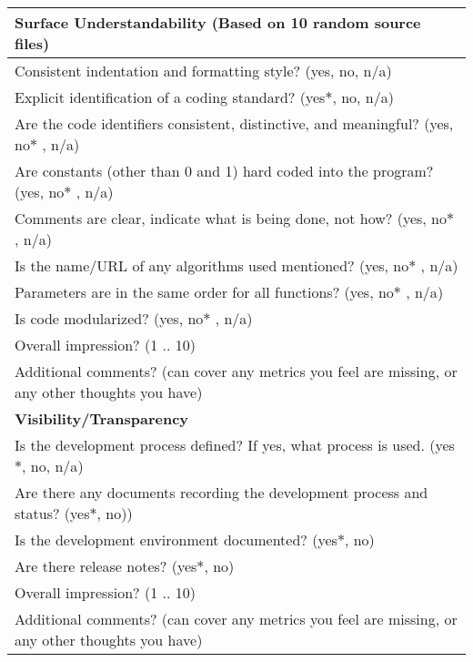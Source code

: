 \begin{table}[H]
\begin{tabular}{p{14cm}}
\hline
\textbf{Surface Understandability (Based on 10 random source files)}\\
\hline
Consistent indentation and formatting style? ({yes, no, n/a})\\
Explicit identification of a coding standard? ({yes$\ast$, no, n/a})\\
Are the code identifiers consistent, distinctive, and meaningful? ({yes, no$\ast$ , n/a})\\
Are constants (other than 0 and 1) hard coded into the program? ({yes, no$\ast$ , n/a})\\
Comments are clear, indicate what is being done, not how? ({yes, no$\ast$ , n/a})\\
Is the name/URL of any algorithms used mentioned? ({yes, no$\ast$ , n/a})\\
Parameters are in the same order for all functions? ({yes, no$\ast$ , n/a})\\
Is code modularized? ({yes, no$\ast$ , n/a})\\
Overall impression? ({1 .. 10})\\
Additional comments? (can cover any metrics you feel are missing, or any other thoughts you have)\\
\hline
\textbf{Visibility/Transparency}\\
\hline
Is the development process defined? If yes, what process is used. ({yes$\ast$, no, n/a})\\
Are there any documents recording the development process and status?  ({yes$\ast$, no}))\\
Is the development environment documented? ({yes$\ast$, no})\\
Are there release notes? ({yes$\ast$, no})\\
Overall impression? ({1 .. 10})\\
Additional comments? (can cover any metrics you feel are missing, or any other thoughts you have)\\
\hline
\end{tabular}
\end{table}

